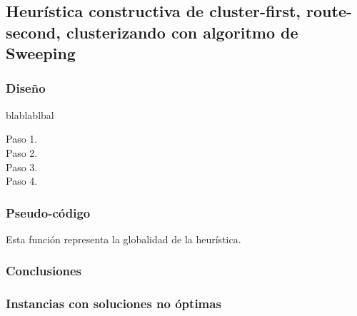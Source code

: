 \subsection{Heurística constructiva de cluster-first, route-second, clusterizando con algoritmo de Sweeping}
\subsubsection{Diseño}
blablablbal

\begin{description}
\item[Paso 1.] 
\item[Paso 2.] 
\item[Paso 3.] 
\item[Paso 4.] 
\end{description}

\subsubsection{Pseudo-código}

% 
Esta función representa la globalidad de la heurística.

\subsubsection{Conclusiones}

\subsubsection{Instancias con soluciones no óptimas}